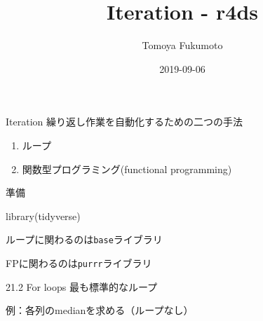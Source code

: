 \documentclass[
  ignorenonframetext,
  aspectratio=169]{beamer}
\title{Iteration - r4ds}
\author{Tomoya Fukumoto}
\date{2019-09-06}
\newenvironment{Shaded}{\begin{snugshade}}{\end{snugshade}}
\newcommand{\AttributeTok}[1]{\textcolor[rgb]{0.77,0.63,0.00}{#1}}
\newcommand{\DecValTok}[1]{\textcolor[rgb]{0.00,0.00,0.81}{#1}}
\newcommand{\FunctionTok}[1]{\textcolor[rgb]{0.00,0.00,0.00}{#1}}
\newcommand{\NormalTok}[1]{#1}
\newcommand{\OtherTok}[1]{\textcolor[rgb]{0.56,0.35,0.01}{#1}}
\newcommand{\SpecialCharTok}[1]{\textcolor[rgb]{0.00,0.00,0.00}{#1}}
\providecommand{\tightlist}{%
  \setlength{\itemsep}{0pt}\setlength{\parskip}{0pt}}
\begin{document}
\frame{\titlepage}

\begin{frame}{Iteration}
\protect\hypertarget{iteration}{}
繰り返し作業を自動化するための二つの手法

\begin{enumerate}
\tightlist
\item
  ループ
\item
  関数型プログラミング(functional programming)
\end{enumerate}
\end{frame}

\begin{frame}[fragile]{準備}
\protect\hypertarget{ux6e96ux5099}{}
\begin{Shaded}
\begin{Highlighting}[]
\FunctionTok{library}\NormalTok{(tidyverse)}
\end{Highlighting}
\end{Shaded}

ループに関わるのは\texttt{base}ライブラリ

FPに関わるのは\texttt{purrr}ライブラリ
\end{frame}

\begin{frame}{21.2 For loops}
\protect\hypertarget{for-loops}{}
最も標準的なループ
\end{frame}

\begin{frame}[fragile]{例：各列のmedianを求める（ループなし）}
\protect\hypertarget{ux4f8bux5404ux5217ux306emedianux3092ux6c42ux3081ux308bux30ebux30fcux30d7ux306aux3057}{}
\begin{Shaded}
\end{Shaded}
\end{frame}
\end{document}
